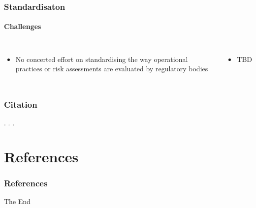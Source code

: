 \documentclass[usenames,dvipsnames,aspectratio=169,serif]{beamer}
\begin{document}
\begin{frame}[fragile] %
   \frametitle{Standardisaton}
   \framesubtitle{Challenges}
   \begin{columns}[t]
      \begin{itemize}
         \item No concerted effort on standardising the way operational practices or risk assessments are evaluated by regulatory bodies
      \end{itemize}
      \begin{itemize}
         \item TBD
      \end{itemize}
   \end{columns}
\end{frame}


\begin{frame}[fragile] %
   \frametitle{Citation}

   .
   \cite{EASA-UAS-ATM-Assessment-2018}.
   \cite{FAA-NPRM-2019-1100}.
\end{frame}


\section*{References}

\begin{frame}[t, allowframebreaks]
   \frametitle{References}
   
   
\end{frame}


\begin{frame}
   \Huge{\centerline{The End}}
\end{frame}

\end{document}
